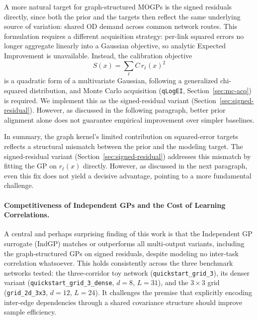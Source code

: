 \documentclass[11pt]{article}
\begin{document}
A more natural target for graph-structured MOGPs is the signed residuals directly, since both the prior and the targets then reflect the same underlying source of variation: shared OD demand across common network routes. This formulation requires a different acquisition strategy: per-link squared errors no longer aggregate linearly into a Gaussian objective, so analytic Expected Improvement is unavailable. Instead, the calibration objective
\begin{equation}
    S(x) = \sum_{\ell} C \, r_\ell(x)^2
\end{equation}
is a quadratic form of a multivariate Gaussian, following a generalized chi-squared distribution, and Monte Carlo acquisition (\texttt{qLogEI}, Section~\ref{sec:mc-acq}) is required. We implement this as the signed-residual variant (Section~\ref{sec:signed-residual}). However, as discussed in the following paragraph, better prior alignment alone does not guarantee empirical improvement over simpler baselines.

In summary, the graph kernel's limited contribution on squared-error targets reflects a structural mismatch between the prior and the modeling target. The signed-residual variant (Section~\ref{sec:signed-residual}) addresses this mismatch by fitting the GP on $r_\ell(x)$ directly. However, as discussed in the next paragraph, even this fix does not yield a decisive advantage, pointing to a more fundamental challenge.

\paragraph{Competitiveness of Independent GPs and the Cost of Learning Correlations.}

A central and perhaps surprising finding of this work is that the Independent GP surrogate (IndGP) matches or outperforms all multi-output variants, including the graph-structured GPs on signed residuals, despite modeling no inter-task correlation whatsoever. This holds consistently across the three benchmark networks tested: the three-corridor toy network (\texttt{quickstart\_grid\_3}), its denser variant (\texttt{quickstart\_grid\_3\_dense}, $d=8$, $L=31$), and the $3\times3$ grid (\texttt{grid\_2d\_3x3}, $d=12$, $L=24$). It challenges the premise that explicitly encoding inter-edge dependencies through a shared covariance structure should improve sample efficiency.
\end{document}
